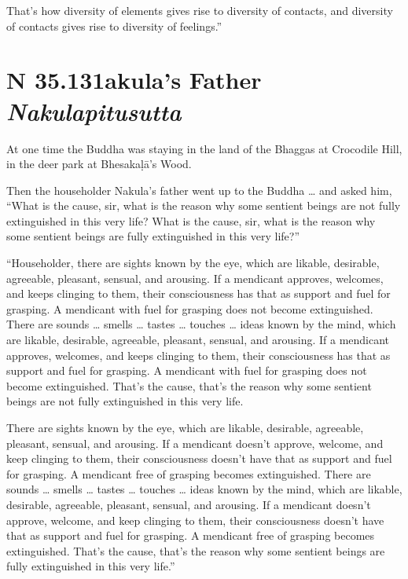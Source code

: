 \documentclass[12pt,openany]{book}%
\newcommand*{\suttatitleacronym}[1]{\smaller[2]{#1}\vspace*{.3em}}
\newcommand*{\suttatitletranslation}[1]{\linebreak{#1}}
\newcommand*{\suttatitleroot}[1]{\linebreak\smaller[2]\itshape{#1}}
\newcommand*{\tocacronym}[1]{\hspace*{-3.3em}{#1}\quad}
\newcommand*{\toctranslation}[1]{#1}
\newcommand*{\tocroot}[1]{(\textit{#1})}
\begin{document}
That’s how diversity of elements gives rise to diversity of contacts, and diversity of contacts gives rise to diversity of feelings.” 

%
\section*{{\suttatitleacronym SN 35.131}{\suttatitletranslation Nakula’s Father }{\suttatitleroot Nakulapitusutta}}
\addcontentsline{toc}{section}{\tocacronym{SN 35.131} \toctranslation{Nakula’s Father } \tocroot{Nakulapitusutta}}

At one time the Buddha was staying in the land of the Bhaggas at Crocodile Hill, in the deer park at \textsanskrit{Bhesakaḷā}’s Wood. 

Then the householder Nakula’s father went up to the Buddha … and asked him, “What is the cause, sir, what is the reason why some sentient beings are not fully extinguished in this very life? What is the cause, sir, what is the reason why some sentient beings are fully extinguished in this very life?” 

“Householder, there are sights known by the eye, which are likable, desirable, agreeable, pleasant, sensual, and arousing. If a mendicant approves, welcomes, and keeps clinging to them, their consciousness has that as support and fuel for grasping. A mendicant with fuel for grasping does not become extinguished. There are sounds … smells … tastes … touches … ideas known by the mind, which are likable, desirable, agreeable, pleasant, sensual, and arousing. If a mendicant approves, welcomes, and keeps clinging to them, their consciousness has that as support and fuel for grasping. A mendicant with fuel for grasping does not become extinguished. That’s the cause, that’s the reason why some sentient beings are not fully extinguished in this very life. 

There are sights known by the eye, which are likable, desirable, agreeable, pleasant, sensual, and arousing. If a mendicant doesn’t approve, welcome, and keep clinging to them, their consciousness doesn’t have that as support and fuel for grasping. A mendicant free of grasping becomes extinguished. There are sounds … smells … tastes … touches … ideas known by the mind, which are likable, desirable, agreeable, pleasant, sensual, and arousing. If a mendicant doesn’t approve, welcome, and keep clinging to them, their consciousness doesn’t have that as support and fuel for grasping. A mendicant free of grasping becomes extinguished. That’s the cause, that’s the reason why some sentient beings are fully extinguished in this very life.” 
\end{document}
